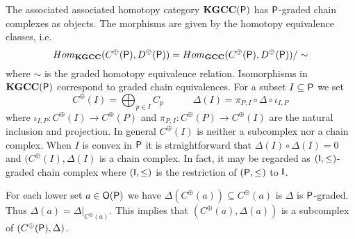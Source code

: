  
 The associated associated homotopy category ${\bf KGCC({\mathsf P})}$ has ${\mathsf P}$-graded chain complexes as objects.  The morphisms are given by the homotopy equivalence classes, i.e. $$Hom_{\bf KGCC}(C^\oplus({\mathsf P}), D^\oplus({\mathsf P})) = Hom_{\bf GCC}(C^\oplus({\mathsf P}),D^\oplus({\mathsf P}))\slash\sim$$ where $\sim$ is the graded homotopy equivalence relation.  Isomorphisms in ${\bf KGCC({\mathsf P})}$ correspond to graded chain equivalences.  For a subset $I\subseteq {\mathsf P}$ we set 
\[
C^\oplus(I) = \bigoplus_{p\in I} C_p\quad\quad \quad \Delta(I) = \pi_{P,I} \circ \Delta \circ \iota_{I,P}
\]
 where $\iota_{I,P}:C^\oplus(I)\to C^\oplus(P)$ and $\pi_{P,I}:C^\oplus(P)\to C^\oplus(I)$ are the natural inclusion and projection.  In general $C^\oplus(I)$ is neither a subcomplex nor a chain complex.  When $I$ is convex in ${\mathsf P}$ it is straightforward that $\Delta(I)\circ\Delta(I) = 0$ and $(C^\oplus(I),\Delta(I)$ is a chain complex.  In fact, it may be regarded as $({\mathsf I},\leq)$-graded chain complex where $({\mathsf I},\leq)$ is the restriction of $({\mathsf P},\leq)$ to ${\mathsf I}$.   
 
  For each lower set $a\in {\mathsf O}({\mathsf P})$ we have $\Delta(C^\oplus(a))\subseteq C^\oplus(a)$ is $\Delta$ is ${\mathsf P}$-graded.  Thus $\Delta(a)=\Delta|_{C^\oplus(a)} $. This implies that $(C^\oplus(a),\Delta(a))$ is a subcomplex of $(C^\oplus({\mathsf P}),\Delta)$.    
  
